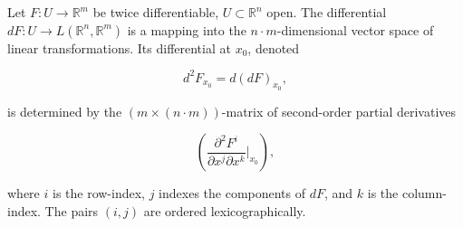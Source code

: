 Let $F: U \to \mathbb{R}^m$ be twice differentiable, $U \subset \mathbb{R}^n$ open. The differential $dF: U \to L(\mathbb{R}^n, \mathbb{R}^m)$ is a mapping into the $n \cdot m$-dimensional vector space of linear transformations. Its differential at $x_0$, denoted

$$d^2F_{x_0} = d(dF)_{x_0},$$

is determined by the $(m \times (n \cdot m))$-matrix of second-order partial derivatives

$$\left( \frac{\partial^2 F^i}{\partial x^j \partial x^k}\bigg|_{x_0} \right),$$

where $i$ is the row-index, $j$ indexes the components of $dF$, and $k$ is the column-index. The pairs $(i, j)$ are ordered lexicographically.
